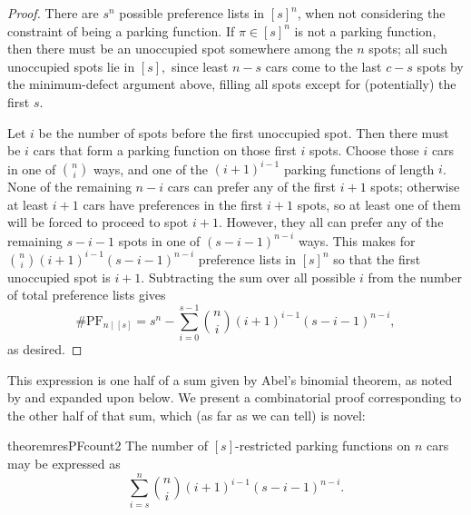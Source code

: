 \documentclass[12 pt]{amsart}
\theoremstyle{definition} %
\theoremstyle{remark} %
\begin{document}
\begin{proof}
    There are $s^{n}$ possible preference lists in $[s]^{n}$, when not considering the constraint of being a parking function. If $\pi \in [s]^{n}$ is not a parking function, then there must be an unoccupied spot somewhere among the $n$ spots; all such unoccupied spots lie in $[s],$ since least $n - s$ cars come to the last $c - s$ spots by the minimum-defect argument above, filling all spots except for (potentially) the first $s$.

	Let $i$ be the number of spots before the first unoccupied spot. Then there must be $i$ cars that form a parking function on those first $i$ spots. Choose those $i$ cars in one of $\binom{n}{i}$ ways, and one of the $(i + 1)^{i - 1}$ parking functions of length $i$. None of the remaining $n - i$ cars can prefer any of the first $i + 1$ spots; otherwise at least $i+1$ cars have preferences in the first $i+1$ spots, so at least one of them will be forced to proceed to spot $i+1$. However, they all can prefer any of the remaining $s - i - 1$ spots in one of $(s - i - 1)^{n - i}$ ways. This makes for $\binom{n}{i} (i + 1)^{i - 1}(s - i - 1)^{n - i}$ preference lists in $[s]^{n}$ so that the first unoccupied spot is $i + 1$. Subtracting the sum over all possible $i$ from the number of total preference lists gives
	\[
		\# \mathrm{PF}_{n \mid [s]} = s^{n} - \sum_{i = 0}^{s - 1} \binom{n}{i} (i + 1)^{i - 1} (s - i - 1)^{n - i},
	\]
    as desired.
\end{proof}

This expression is one half of a sum given by Abel's binomial theorem, as noted by \cite{cameron-johannsen-prellberg-schweitzer-2008} and expanded upon below. We present a combinatorial proof corresponding to the other half of that sum, which (as far as we can tell) is novel:

\begin{restatable}{theorem}{resPFcount2}
    \label{thm:resPFcount2}
    The number of $[s]$-restricted parking functions on $n$ cars may be expressed as
    \[\sum_{i = s}^{n} \binom{n}{i} (i + 1)^{i - 1} (s - i - 1)^{n - i}.\]
\end{restatable}
\end{document}
